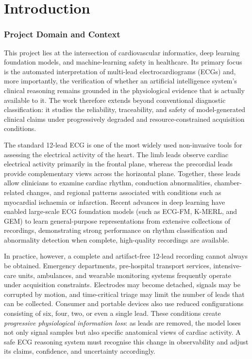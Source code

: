 \documentclass{ssnreview}
\begin{document}
\chapter{Introduction}

\subsection*{Project Domain and Context}

This project lies at the intersection of cardiovascular informatics, deep learning
foundation models, and machine-learning safety in healthcare. Its primary focus is the
automated interpretation of multi-lead electrocardiograms (ECGs) and, more importantly,
the verification of whether an artificial intelligence system's clinical reasoning remains
grounded in the physiological evidence that is actually available to it. The work therefore
extends beyond conventional diagnostic classification: it studies the reliability,
traceability, and safety of model-generated clinical claims under progressively degraded
and resource-constrained acquisition conditions.

The standard 12-lead ECG is one of the most widely used non-invasive tools for assessing
the electrical activity of the heart. The limb leads observe cardiac electrical activity
primarily in the frontal plane, whereas the precordial leads provide complementary views
across the horizontal plane. Together, these leads allow clinicians to examine cardiac
rhythm, conduction abnormalities, chamber-related changes, and regional patterns associated
with conditions such as myocardial ischaemia or infarction. Recent advances in deep learning
have enabled large-scale ECG foundation models (such as ECG-FM, K-MERL, and GEM) to learn
general-purpose representations from extensive collections of recordings, demonstrating
strong performance on rhythm classification and abnormality detection when complete,
high-quality recordings are available.

In practice, however, a complete and artifact-free 12-lead recording cannot always be
obtained. Emergency departments, pre-hospital transport services, intensive-care units,
ambulances, and wearable monitoring systems frequently operate under acquisition
constraints. Electrodes may become detached, signals may be corrupted by motion, and
time-critical triage may limit the number of leads that can be collected. Consumer and
portable devices also use reduced configurations consisting of six, four, two, or even a
single lead. These conditions create \emph{progressive physiological information loss}: as
leads are removed, the model loses not only signal samples but also specific anatomical
views of cardiac activity. A safe ECG reasoning system must recognise this change in
observability and adjust its claims, confidence, and uncertainty accordingly.
\end{document}
